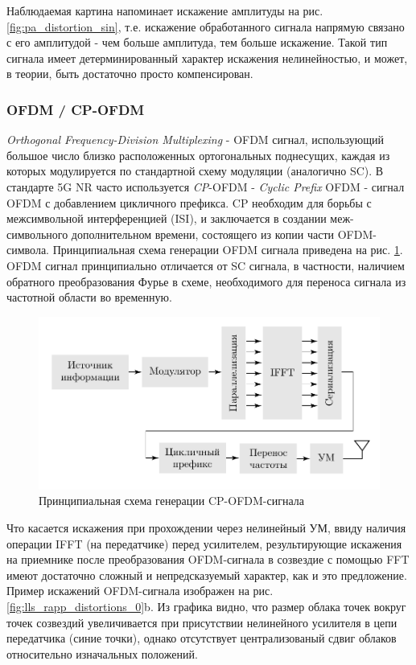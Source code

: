 Наблюдаемая картина напоминает искажение амплитуды на рис.
\ref{fig:pa_distortion_sin}, т.е. искажение обработанного сигнала напрямую
связано с его амплитудой - чем больше амплитуда, тем больше искажение.
Такой тип сигнала имеет детерминированный характер искажения нелинейностью,
и может, в теории, быть достаточно просто компенсирован.


\subsubsection{OFDM / CP-OFDM}
\textit{Orthogonal Frequency-Division Multiplexing} - OFDM сигнал,
использующий большое число близко расположенных ортогональных поднесущих,
каждая из которых модулируется по стандартной схему модуляции (аналогично
SC). В стандарте 5G NR часто используется \textit{CP}-OFDM - \textit{Cyclic Prefix}
OFDM - сигнал OFDM с добавлением цикличного префикса. CP необходим  для
борьбы с межсимвольной интерференцией (ISI), и заключается в создании
меж-символьного дополнительном времени, состоящего из копии части
OFDM-символа. Принципиальная схема генерации OFDM сигнала приведена на рис.
\ref{fig:ofdm_scheme}. OFDM сигнал принципиально отличается от SC сигнала,
в частности, наличием обратного преобразования Фурье в схеме, необходимого
для переноса сигнала из частотной области во временную.
\begin{figure}[h!]
    \centering
    \includegraphics[scale=1]{figs/ofdm_scheme.pdf}
    \caption{Принципиальная схема генерации CP-OFDM-сигнала}
    \label{fig:ofdm_scheme}
\end{figure}

Что касается искажения при прохождении через нелинейный УМ, ввиду наличия
операции IFFT (на передатчике) перед усилителем, результирующие искажения
на приемнике после преобразования OFDM-сигнала в созвездие с помощью FFT
имеют достаточно сложный и непредсказуемый характер, как и это предложение.
Пример искажений OFDM-сигнала изображен на рис.
\ref{fig:lls_rapp_distortions_0}b. Из графика видно, что размер облака
точек вокруг точек созвездий увеличивается при присутствии нелинейного
усилителя в цепи передатчика (синие точки), однако отсутствует
централизованый сдвиг облаков относительно изначальных положений. 

